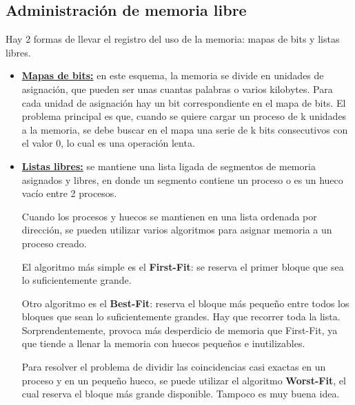 \subsection{Administración de memoria libre}

Hay 2 formas de llevar el registro del uso de la memoria: mapas de bits y listas libres.

\begin{itemize}

\item \textbf{\underline{Mapas de bits:}} en este esquema, la memoria se divide en unidades de asignación, que pueden ser unas cuantas palabras o varios kilobytes. Para cada unidad de asignación hay un bit correspondiente en el mapa de bits. El problema principal es que, cuando se quiere cargar un proceso de k unidades a la memoria, se debe buscar en el mapa una serie de k bits consecutivos con el valor 0, lo cual es una operación lenta.

\item \textbf{\underline{Listas libres:}} se mantiene una lista ligada de segmentos de memoria asignados y libres, en donde un segmento contiene un proceso o es un hueco vacío entre 2 procesos.

Cuando los procesos y huecos se mantienen en una lista ordenada por dirección, se pueden utilizar varios algoritmos para asignar memoria a un proceso creado.

El algoritmo más simple es el \textbf{First-Fit}: se reserva el primer bloque que sea lo suficientemente grande.

Otro algoritmo es el \textbf{Best-Fit}: reserva el bloque más pequeño entre todos los bloques que sean lo suficientemente grandes. Hay que recorrer toda la lista. Sorprendentemente, provoca más desperdicio de memoria que First-Fit, ya que tiende a llenar la memoria con huecos pequeños e inutilizables.

Para resolver el problema de dividir las coincidencias casi exactas en un proceso y en un pequeño hueco, se puede utilizar el algoritmo \textbf{Worst-Fit}, el cual reserva el bloque más grande disponible. Tampoco es muy buena idea.


\end{itemize}
